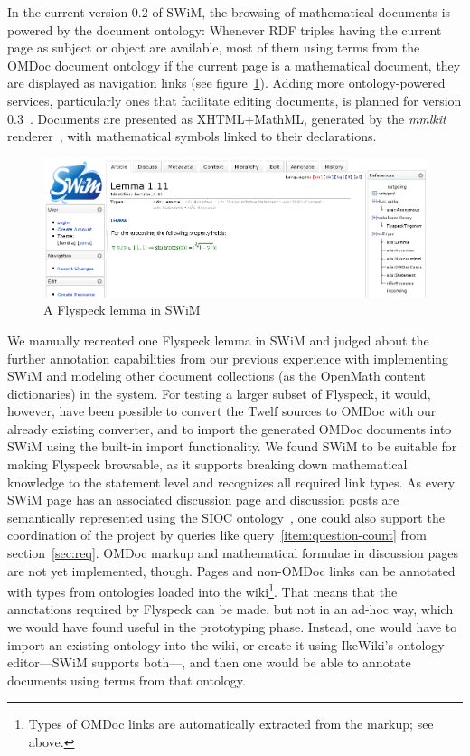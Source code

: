 \documentclass{llncs}
\begin{document}
In the current version 0.2 of SWiM, the browsing of mathematical documents is powered by
the document ontology: Whenever RDF triples having the current page as subject or object
are available, most of them using terms from the OMDoc document ontology if the current
page is a mathematical document, they are displayed as navigation links (see
figure~\ref{fig:swim-lemma}).  Adding more ontology-powered services, particularly ones
that facilitate editing documents, is planned for version
0.3~\cite{swim-roadmap,Lange:SWiMSciColl07}.  Documents are presented as XHTML+MathML,
generated by the \textit{mmlkit} renderer~\cite{mmlkit:web}, with mathematical symbols
linked to their declarations.

\begin{figure}
  \centering
  \includegraphics[width=.7\textwidth]{swim-lemma}
  \caption{A Flyspeck lemma in SWiM}
  \label{fig:swim-lemma}
\end{figure}

We manually recreated one Flyspeck lemma in SWiM and judged about the further annotation
capabilities from our previous experience with implementing SWiM and modeling other
document collections (as the OpenMath content dictionaries) in the system. For testing a larger subset of Flyspeck, it would, however, have been possible to
convert the Twelf sources to OMDoc with our already existing converter, and to import the
generated OMDoc documents into SWiM using the built-in import functionality.  We found
SWiM to be suitable for making Flyspeck browsable, as it supports breaking down
mathematical knowledge to the statement level and recognizes all required link types.  As
every SWiM page has an associated discussion page and discussion posts are semantically
represented using the SIOC ontology~\cite{SIOC:web}, one could also support the
coordination of the project by queries like query~\ref{item:question-count} from
section~\ref{sec:req}.  OMDoc markup and mathematical formulae in discussion pages are not
yet implemented, though.  Pages and non-OMDoc links can be annotated with types from
ontologies loaded into the wiki\footnote{Types of OMDoc links are automatically extracted
  from the markup; see above.}.  That means that the annotations required by Flyspeck can
be made, but not in an ad-hoc way, which we would have found useful in the prototyping
phase.  Instead, one would have to import an existing ontology into the wiki, or create it
using IkeWiki's ontology editor---SWiM supports both---, and then one would be able to
annotate documents using terms from that ontology.
\end{document}
